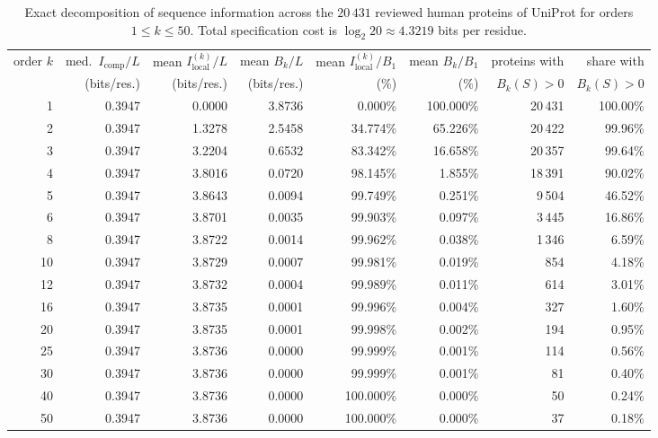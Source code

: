 \documentclass[11pt]{article}
\theoremstyle{plain}
\theoremstyle{definition}
\theoremstyle{remark}
\begin{document}
\begin{table}[t]
\centering\footnotesize\setlength{\tabcolsep}{3.5pt}
\begin{tabular}{rrrrrrrr}
\toprule
order $k$ & med.\ $I_{\mathrm{comp}}/L$ & mean $I_{\mathrm{local}}^{(k)}/L$ & mean $B_k/L$
 & mean $I_{\mathrm{local}}^{(k)}/B_1$ & mean $B_k/B_1$ & proteins with & share with\\
 & (bits/res.) & (bits/res.) & (bits/res.) & (\%) & (\%) & $B_k(S)>0$ & $B_k(S)>0$\\
\midrule
1  & 0.3947 & 0.0000 & 3.8736 &   0.000\% & 100.000\% & 20\,431 & 100.00\%\\
2  & 0.3947 & 1.3278 & 2.5458 &  34.774\% &  65.226\% & 20\,422 &  99.96\%\\
3  & 0.3947 & 3.2204 & 0.6532 &  83.342\% &  16.658\% & 20\,357 &  99.64\%\\
4  & 0.3947 & 3.8016 & 0.0720 &  98.145\% &   1.855\% & 18\,391 &  90.02\%\\
5  & 0.3947 & 3.8643 & 0.0094 &  99.749\% &   0.251\% &  9\,504 &  46.52\%\\
6  & 0.3947 & 3.8701 & 0.0035 &  99.903\% &   0.097\% &  3\,445 &  16.86\%\\
8  & 0.3947 & 3.8722 & 0.0014 &  99.962\% &   0.038\% &  1\,346 &   6.59\%\\
10 & 0.3947 & 3.8729 & 0.0007 &  99.981\% &   0.019\% &    854  &   4.18\%\\
12 & 0.3947 & 3.8732 & 0.0004 &  99.989\% &   0.011\% &    614  &   3.01\%\\
16 & 0.3947 & 3.8735 & 0.0001 &  99.996\% &   0.004\% &    327  &   1.60\%\\
20 & 0.3947 & 3.8735 & 0.0001 &  99.998\% &   0.002\% &    194  &   0.95\%\\
25 & 0.3947 & 3.8736 & 0.0000 &  99.999\% &   0.001\% &    114  &   0.56\%\\
30 & 0.3947 & 3.8736 & 0.0000 &  99.999\% &   0.001\% &     81  &   0.40\%\\
40 & 0.3947 & 3.8736 & 0.0000 & 100.000\% &   0.000\% &     50  &   0.24\%\\
50 & 0.3947 & 3.8736 & 0.0000 & 100.000\% &   0.000\% &     37  &   0.18\%\\
\bottomrule
\end{tabular}
\caption{Exact decomposition of sequence information across the $20\,431$ reviewed human proteins of UniProt for
orders $1\le k\le50$. Total specification cost is $\log_2 20\approx4.3219$ bits per residue.}\label{tab:decomp}
\end{table}
\end{document}
